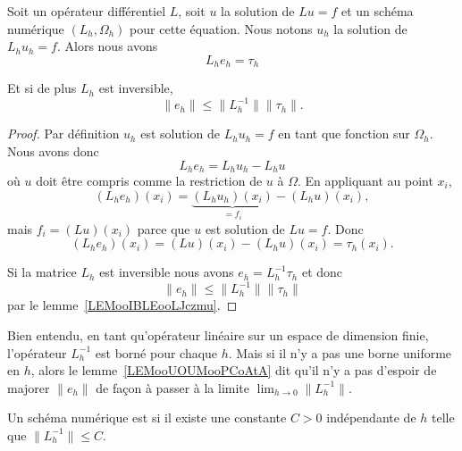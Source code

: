 \begin{lemma}       \label{LEMooUOUMooPCoAtA}
	Soit un opérateur différentiel \( L\), soit \( u\) la solution de \( Lu=f\) et un schéma numérique \( (L_h,\Omega_h)\) pour cette équation. Nous notons \( u_h\) la solution de \( L_hu_h=f\). Alors nous avons
	\begin{equation}
		L_he_h=\tau_h
	\end{equation}

	Et si de plus \( L_h\) est inversible,
	\begin{equation}
		\| e_h \|\leq \| L_h^{-1} \|\| \tau_h \|.
	\end{equation}
\end{lemma}

\begin{proof}
	Par définition \( u_h\) est solution de \( L_hu_h=f\) en tant que fonction sur \( \Omega_h\). Nous avons donc
	\begin{equation}
		L_he_h=L_hu_h-L_hu
	\end{equation}
	où \( u\) doit être compris comme la restriction de \( u\) à \( \Omega\). En appliquant au point \( x_i\),
	\begin{equation}
		(L_he_h)(x_i)=\underbrace{(L_hu_h)(x_i)}_{=f_i}-(L_hu)(x_i),
	\end{equation}
	mais \( f_i=(Lu)(x_i)\) parce que \( u\) est solution de \( Lu=f\). Donc
	\begin{equation}
		(L_he_h)(x_i)=(Lu)(x_i)-(L_hu)(x_i)=\tau_h(x_i).
	\end{equation}

	Si la matrice \( L_h\) est inversible nous avons \( e_h=L_h^{-1}\tau_h\) et donc
	\begin{equation}
		\| e_h \|\leq \| L_h^{-1} \|\| \tau_h \|
	\end{equation}
	par le lemme~\ref{LEMooIBLEooLJczmu}.
\end{proof}

Bien entendu, en tant qu'opérateur linéaire sur un espace de dimension finie, l'opérateur \( L_h^{-1}\) est borné pour chaque \( h\). Mais si il n'y a pas une borne uniforme en \( h\), alors le lemme~\ref{LEMooUOUMooPCoAtA} dit qu'il n'y a pas d'espoir de majorer \( \| e_h \|\) de façon à passer à la limite \( \lim_{h\to 0} \| L_h^{-1} \|\).

\begin{definition}
	Un schéma numérique est  si il existe une constante \( C>0\) indépendante de \( h\) telle que \( \| L_h^{-1} \|\leq C\).
\end{definition}

